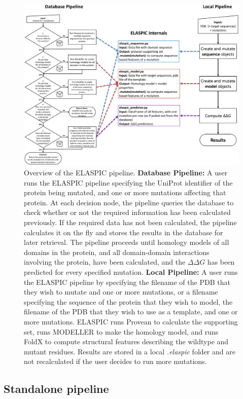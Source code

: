 \begin{figure}[!tb]
	\centering
	\includegraphics[width=1.0\textwidth]{static/elaspic/elaspic_flowchart.pdf}
	\caption[ELASPIC pipeline.]{Overview of the ELASPIC pipeline. \textbf{Database Pipeline:} A user runs the ELASPIC pipeline specifying the UniProt identifier of the protein being mutated, and one or more mutations affecting that protein. At each decision node, the pipeline queries the database to check whether or not the required information has been calculated previously. If the required data has not been calculated, the pipeline calculates it on the fly and stores the results in the database for later retrieval. The pipeline proceeds until homology models of all domains in the protein, and all domain-domain interactions involving the protein, have been calculated, and the $\Delta \Delta G$ has been predicted for every specified mutation. \textbf{Local Pipeline:} A user runs the ELASPIC pipeline by specifying the filename of the PDB that they wish to mutate and one or more mutations, or a filename specifying the sequence of the protein that they wish to model, the filename of the PDB that they wish to use as a template, and one or more mutations. ELASPIC runs Provean to calculate the supporting set, runs MODELLER to make the homology model, and runs FoldX to compute structural features describing the wildtype and mutant residues. Results are stored in a local \textit{.elaspic} folder and are not recalculated if the user decides to run more mutations.}
	\label{fig:elaspic_pipeline}
\end{figure}


\subsection{Standalone pipeline}

